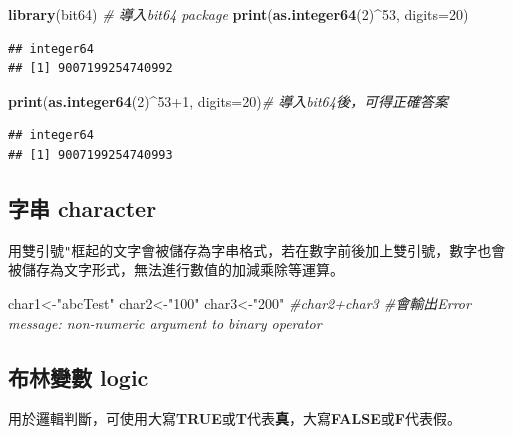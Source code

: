 \documentclass[]{book}
\newenvironment{Shaded}{\begin{snugshade}}{\end{snugshade}}
\newcommand{\KeywordTok}[1]{\textcolor[rgb]{0.13,0.29,0.53}{\textbf{{#1}}}}
\newcommand{\DataTypeTok}[1]{\textcolor[rgb]{0.13,0.29,0.53}{{#1}}}
\newcommand{\DecValTok}[1]{\textcolor[rgb]{0.00,0.00,0.81}{{#1}}}
\newcommand{\StringTok}[1]{\textcolor[rgb]{0.31,0.60,0.02}{{#1}}}
\newcommand{\CommentTok}[1]{\textcolor[rgb]{0.56,0.35,0.01}{\textit{{#1}}}}
\newcommand{\NormalTok}[1]{{#1}}
\theoremstyle{definition}
\theoremstyle{definition}
\theoremstyle{remark}
\begin{document}
\begin{Shaded}
\begin{Highlighting}[]
\KeywordTok{library}\NormalTok{(bit64) }\CommentTok{# 導入bit64 package}
\KeywordTok{print}\NormalTok{(}\KeywordTok{as.integer64}\NormalTok{(}\DecValTok{2}\NormalTok{)^}\DecValTok{53}\NormalTok{, }\DataTypeTok{digits=}\DecValTok{20}\NormalTok{)}
\end{Highlighting}
\end{Shaded}

\begin{verbatim}
## integer64
## [1] 9007199254740992
\end{verbatim}

\begin{Shaded}
\begin{Highlighting}[]
\KeywordTok{print}\NormalTok{(}\KeywordTok{as.integer64}\NormalTok{(}\DecValTok{2}\NormalTok{)^}\DecValTok{53+1}\NormalTok{, }\DataTypeTok{digits=}\DecValTok{20}\NormalTok{)}\CommentTok{# 導入bit64後，可得正確答案}
\end{Highlighting}
\end{Shaded}

\begin{verbatim}
## integer64
## [1] 9007199254740993
\end{verbatim}

\subsection{字串 character}\label{-character}

用雙引號\texttt{"}框起的文字會被儲存為字串格式，若在數字前後加上雙引號，數字也會被儲存為文字形式，無法進行數值的加減乘除等運算。

\begin{Shaded}
\begin{Highlighting}[]
\NormalTok{char1<-}\StringTok{"abcTest"} 
\NormalTok{char2<-}\StringTok{"100"}
\NormalTok{char3<-}\StringTok{"200"}
\CommentTok{#char2+char3 #會輸出Error message: non-numeric argument to binary operator}
\end{Highlighting}
\end{Shaded}

\subsection{布林變數 logic}\label{-logic}

用於邏輯判斷，可使用大寫\textbf{TRUE}或\textbf{T}代表\textbf{真}，大寫\textbf{FALSE}或\textbf{F}代表假。
\end{document}
